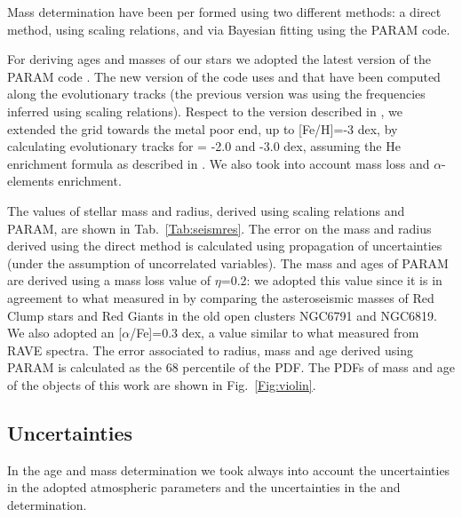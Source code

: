 \documentclass{aa}
\begin{document}
Mass determination have been per formed using two different methods: a direct method, using scaling relations, and via Bayesian fitting  using the PARAM code. 

For deriving ages and masses of our stars we adopted the latest version of the PARAM code \citep{2017MNRAS.467.1433R}. The new version of the code uses \dnu and \numax that have been computed along the evolutionary tracks (the previous version was using the frequencies inferred using scaling relations). Respect to the version described in \citep{2017MNRAS.467.1433R}, we extended the grid towards the metal poor end, up to [Fe/H]=-3 dex, by calculating evolutionary tracks for \FeH = -2.0 and -3.0 dex, assuming the He enrichment formula as described in \citet{2017MNRAS.467.1433R}. We also took into account mass loss and $\alpha$-elements enrichment.

The values of stellar mass and radius, derived using scaling relations and PARAM, are shown in Tab.~\ref{Tab:seismres}. The error on the mass and radius derived using the direct method is calculated using propagation of uncertainties (under the assumption of uncorrelated variables). The mass and ages of PARAM are derived using a mass loss value of $\eta$=0.2: we adopted this value since it is in agreement to what measured in \cite{Miglio2012} by comparing the asteroseismic masses of Red Clump stars and Red Giants in the old open clusters NGC6791 and NGC6819. We also adopted an [$\alpha$/Fe]=0.3 dex, a value similar to what measured from RAVE spectra.  The error associated to radius, mass and age derived using PARAM is calculated as the 68 percentile of the PDF. The PDFs of mass and age of the objects of this work are shown in Fig.~\ref{Fig:violin}.

\subsection{Uncertainties}

In the age and mass determination we took always into account the uncertainties in the adopted  atmospheric parameters and the uncertainties in the \dnu and \numax determination.
\end{document}
